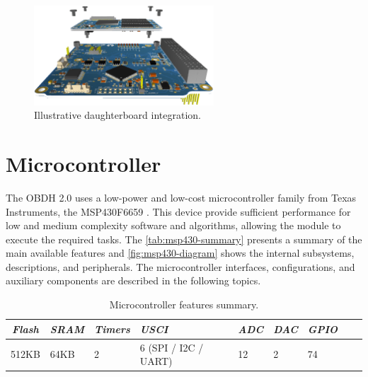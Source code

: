 \begin{figure}[!ht]
    \begin{center}
        \includegraphics[width=0.6\textwidth]{figures/daughterboard-integration.png}
        \caption{Illustrative daughterboard integration.}
        \label{fig:daughterboard-integration}
    \end{center}
\end{figure}

\section{Microcontroller}

The OBDH 2.0 uses a low-power and low-cost microcontroller family from Texas Instruments, the MSP430F6659 \cite{msp430f6659}. This device provide sufficient performance for low and medium complexity software and algorithms, allowing the module to execute the required tasks. The \autoref{tab:msp430-summary} presents a summary of the main available features and \autoref{fig:msp430-diagram} shows the internal subsystems, descriptions, and peripherals. The microcontroller interfaces, configurations, and auxiliary components are described in the following topics.

\begin{table}[!h]
    \centering
    \begin{tabular}{cllllllll}
        \toprule[1.5pt]
        \textit{Flash} & \textit{SRAM} & \textit{Timers} & \textit{USCI} & \textit{ADC} & \textit{DAC} & \textit{GPIO} \\
        \midrule
        512KB  & 64KB  & 2  & 6 (SPI / I2C / UART)  & 12  & 2  & 74           \\
        \bottomrule[1.5pt]
    \end{tabular}
    \caption{Microcontroller features summary.}
    \label{tab:msp430-summary}
\end{table}


